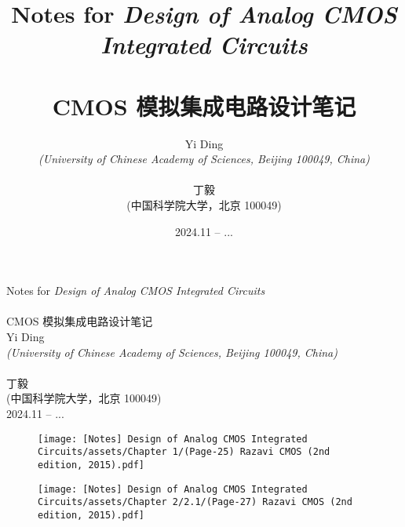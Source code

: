 \documentclass[UTF8]{report}
\title{
    Notes for \textit{Design of Analog CMOS Integrated Circuits}\\ ~ \\ 
    CMOS 模拟集成电路设计笔记}
\author{Yi Ding \\ \footnotesize \textit{(University of Chinese Academy of Sciences, Beijing 100049, China)} \\ ~ \\ 丁毅\\ \footnotesize {\kaishu (中国科学院大学，北京 100049)} }
\date{\footnotesize 2024.11 -- ...}
\begin{document}
 


\begin{titlepage}
\begin{center}
\vspace*{\fill}



{\huge 
    Notes for \textit{Design of Analog CMOS Integrated Circuits}
    \\ ~ \\
    CMOS 模拟集成电路设计笔记
}
\\\vspace*{1.2cm}
{\large Yi Ding \\ \small\textit{(University of Chinese Academy of Sciences, Beijing 100049, China)} \\ ~ \\ 丁毅\\ \small {\kaishu (中国科学院大学，北京 100049)} }
\\\vspace*{0.8cm}
{\small
2024.11 -- ...
}
\end{center}
\vspace*{1cm}
\begin{figure}[H]\centering
    \texttt{[image: [Notes] Design of Analog CMOS Integrated Circuits/assets/Chapter 1/(Page-25) Razavi CMOS (2nd edition, 2015).pdf]}
\end{figure}
\vspace*{5mm}
\begin{figure}[H]\centering
    \texttt{[image: [Notes] Design of Analog CMOS Integrated Circuits/assets/Chapter 2/2.1/(Page-27) Razavi CMOS (2nd edition, 2015).pdf]}
\end{figure}


\vspace*{\fill}
%
\end{titlepage}
    \newpage  
    \thispagestyle{fancy}   %
\end{document}

